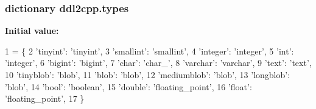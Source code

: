 \subsubsection[{types}]{\setlength{\rightskip}{0pt plus 5cm}dictionary ddl2cpp.\+types}\label{namespaceddl2cpp_aa60a82f28e1ca899d699db901e2de22b}
{\bfseries Initial value\+:}
\begin{DoxyCode}
1 = \{
2     \textcolor{stringliteral}{'tinyint'}: \textcolor{stringliteral}{'tinyint'},
3     \textcolor{stringliteral}{'smallint'}: \textcolor{stringliteral}{'smallint'},
4     \textcolor{stringliteral}{'integer'}: \textcolor{stringliteral}{'integer'},
5     \textcolor{stringliteral}{'int'}: \textcolor{stringliteral}{'integer'},
6     \textcolor{stringliteral}{'bigint'}: \textcolor{stringliteral}{'bigint'},
7     \textcolor{stringliteral}{'char'}: \textcolor{stringliteral}{'char\_'},
8     \textcolor{stringliteral}{'varchar'}: \textcolor{stringliteral}{'varchar'},
9     \textcolor{stringliteral}{'text'}: \textcolor{stringliteral}{'text'},
10     \textcolor{stringliteral}{'tinyblob'}: \textcolor{stringliteral}{'blob'},
11     \textcolor{stringliteral}{'blob'}: \textcolor{stringliteral}{'blob'},
12     \textcolor{stringliteral}{'mediumblob'}: \textcolor{stringliteral}{'blob'},
13     \textcolor{stringliteral}{'longblob'}: \textcolor{stringliteral}{'blob'},
14     \textcolor{stringliteral}{'bool'}: \textcolor{stringliteral}{'boolean'},
15     \textcolor{stringliteral}{'double'}: \textcolor{stringliteral}{'floating\_point'},
16     \textcolor{stringliteral}{'float'}: \textcolor{stringliteral}{'floating\_point'},
17     \}
\end{DoxyCode}
